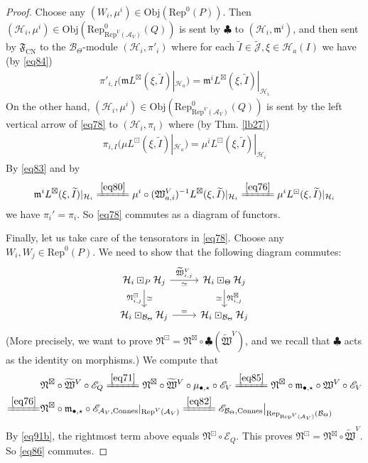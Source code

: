 \documentclass[11pt,b5paper,notitlepage]{article}
\theoremstyle{definition}
\theoremstyle{plain}
\newcommand{\fk}{\mathfrak}
\newcommand{\mc}{\mathcal}
\newcommand{\wtd}{\widetilde}
\newcommand{\Rep}{\mathrm{Rep}}
\newcommand{\scr}{\mathscr}
\newcommand{\Jtd}{\widetilde{\mathcal J}}
\newcommand{\blt}{\bullet}
\newcommand{\Obj}{\mathrm{Obj}}
\newcommand{\mk}{\mathfrak m}
\newcommand{\CN}{{\scriptscriptstyle \mathrm{CN}}}
\newcommand{\Connes}{\mathrm{Connes}}
\numberwithin{equation}{section}
\begin{document}
\begin{proof}
Choose any $(W_i,\mu^i)\in\Obj(\Rep^0(P))$. Then $(\mc H_i,\mu^i)\in\Obj(\Rep^0_{\Rep^V(\mc A_V)}(Q))$ is sent by $\clubsuit$ to $(\mc H_i,\mk^i)$, and then sent by $\fk F_\CN$ to the $\mc B_\Theta$-module $(\mc H_i,\pi'_i)$ where for each $\wtd I\in\Jtd,\xi\in\mc H_a(I)$ we have (by \eqref{eq84})
\begin{align*}
\pi'_{i,I}(\mk L^\boxtimes(\xi,\wtd I)|_{\mc H_a})=\mk^i L^\boxtimes(\xi,\wtd I)|_{\mc H_i}
\end{align*}
On the other hand, $(\mc H_i,\mu^i)\in\Obj(\Rep^0_{\Rep^V(\mc A_V)}(Q))$ is sent by the left vertical arrow of \eqref{eq78} to $(\mc H_i,\pi_i)$ where (by Thm. \ref{lb27})
\begin{align*}
\pi_{i,I}(\mu L^\boxdot(\xi,\wtd I)|_{\mc H_a})=\mu^i L^\boxdot(\xi,\wtd I)|_{\mc H_i}
\end{align*}
By \eqref{eq83} and by
\begin{align}
\mk^i L^\boxtimes(\xi,\wtd I)|_{\mc H_i}\xlongequal{\eqref{eq80}}\mu^i\circ(\fk W^V_{a,i})^{-1}L^\boxtimes(\xi,\wtd I)|_{\mc H_i}\xlongequal{\eqref{eq76}}\mu^i L^\boxdot(\xi,\wtd I)|_{\mc H_i}
\end{align}
we have $\pi_i'=\pi_i$. So \eqref{eq78} commutes as a diagram of functors.

Finally, let us take care of the tensorators in \eqref{eq78}. Choose any $W_i,W_j\in\Rep^0(P)$. We need to show that the following diagram commutes:
\begin{equation}\label{eq86}
\begin{tikzcd}
\mc H_i\boxdot_P\mc H_j \arrow[r,"{\wtd {\fk W}^V_{i,j}}","\simeq"'] \arrow[d,"\fk N^\boxdot_{i,j}"',"\simeq"] & \mc H_i\boxdot_\Theta\mc H_j \arrow[d,"\fk N^\boxtimes_{i,j}","\simeq"'] \\
\mc H_i\boxdot_{\mc B_\Theta}\mc H_j \arrow[r,"="]           & \mc H_i\boxdot_{\mc B_\Theta}\mc H_j         
\end{tikzcd}
\end{equation}
(More precisely, we want to prove  $\fk N^\boxdot=\fk N^\boxtimes\circ\clubsuit(\wtd{\fk W}^V)$, and we recall that $\clubsuit$ acts as the identity on morphisms.) We compute that
\begin{align*}
&\fk N^\boxtimes\circ\wtd{\fk W}^V\circ\scr E_Q\xlongequal{\eqref{eq71}}\fk N^\boxtimes\circ\wtd{\fk W}^V\circ \mu_{\blt,\star}\circ\scr E_V\xlongequal{\eqref{eq85}}\fk N^\boxtimes\circ\mk_{\blt,\star}\circ \fk W^V\circ\scr E_V\\
\xlongequal{\eqref{eq76}}&\fk N^\boxtimes\circ\mk_{\blt,\star}\circ \scr E_{\mc A_V,\Connes}|_{\Rep^V(\mc A_V)}\xlongequal{\eqref{eq82}}\scr E_{\mc B_{\Theta},\Connes}\big|_{\Rep_{\Rep^V(\mc A_V)}(\mc B_\Theta)}
\end{align*}
By \eqref{eq91b}, the rightmost term above equals $\fk N^\boxdot\circ\scr E_Q$. This proves $\fk N^\boxdot=\fk N^\boxtimes\circ\wtd{\fk W}^V$. So \eqref{eq86} commutes.
\end{proof}
\end{document}
